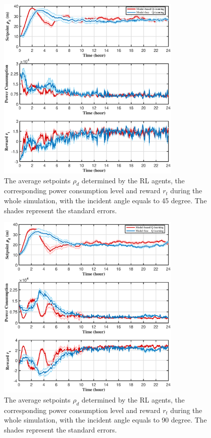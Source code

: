 \begin{sloppypar}
\begin{figure}[!htp]
	\centering
	\includegraphics[width=3.5in]{Images/45_comparison.eps}
	\caption{The average setpoints $\rho_d$ determined by the RL agents, the corresponding  power consumption level and reward $r_t$ during the whole simulation, with the incident angle equals to 45 degree. The shades represent the standard errors.}
	\label{fig:rl_sim_45}
\end{figure}

\begin{figure}[!htp]
	\centering
	\includegraphics[width=3.5in]{Images/90_comparison.eps}
	\caption{The average setpoints $\rho_d$ determined by the RL agents, the corresponding  power consumption level and reward $r_t$ during the whole simulation, with the incident angle equals to 90 degree. The shades represent the standard errors.}
	\label{fig:rl_sim_90}
\end{figure}


\end{sloppypar}
